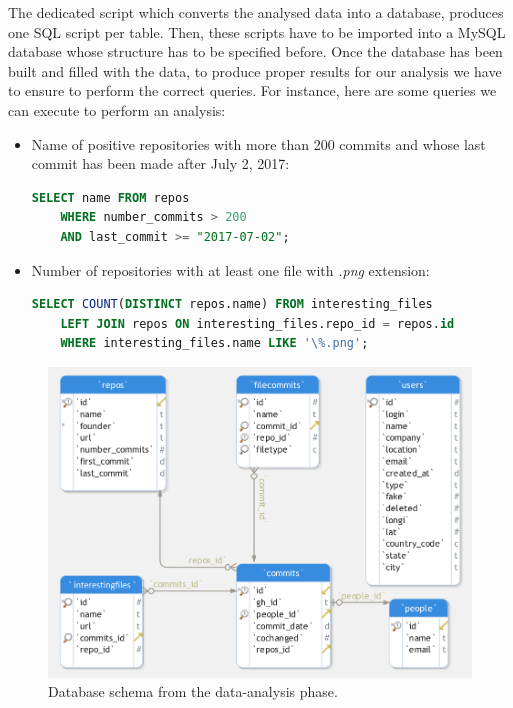 \documentclass[a4paper, 12pt]{book}
\begin{document}
The dedicated script which converts the analysed data into a database, produces one SQL script per table. Then, these
scripts have to be imported into a MySQL database whose structure has to be specified before.
Once the database has been built and filled with the data, to produce proper results for our analysis we have to ensure
to perform the correct queries. For instance, here are some queries we can execute to perform an analysis:
\begin{itemize}
    \item Name of positive repositories with more than 200 commits and whose last commit has been made after July 2, 2017:
    \begin{lstlisting}[language=SQL]
    SELECT name FROM repos
    WHERE number_commits > 200
    AND last_commit >= "2017-07-02"; \end{lstlisting}
    \newpage
    \item Number of repositories with at least one file with \textit{.png} extension:
    \begin{lstlisting}[language=SQL]
    SELECT COUNT(DISTINCT repos.name) FROM interesting_files
    LEFT JOIN repos ON interesting_files.repo_id = repos.id
    WHERE interesting_files.name LIKE '\%.png'; \end{lstlisting}
\end{itemize}

\begin{figure}
  \centering
  \includegraphics[width=15cm, keepaspectratio]{img/dbschema-generic}
  \caption{Database schema from the data-analysis phase.}
  \label{fig:dbschema}
\end{figure}
\cleardoublepage
\end{document}
